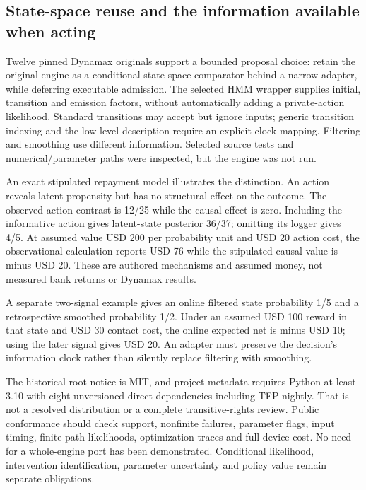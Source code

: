 \hypertarget{state-space-reuse-and-the-information-available-when-acting}{%
\subsection{State-space reuse and the information available when
acting}\label{state-space-reuse-and-the-information-available-when-acting}}

Twelve pinned Dynamax originals support a bounded proposal choice:
retain the original engine as a conditional-state-space comparator
behind a narrow adapter, while deferring executable admission. The
selected HMM wrapper supplies initial, transition and emission factors,
without automatically adding a private-action likelihood. Standard
transitions may accept but ignore inputs; generic transition indexing
and the low-level description require an explicit clock mapping.
Filtering and smoothing use different information. Selected source tests
and numerical/parameter paths were inspected, but the engine was not
run. \citep{exec19_dynamax_source}

An exact stipulated repayment model illustrates the distinction. An
action reveals latent propensity but has no structural effect on the
outcome. The observed action contrast is 12/25 while the causal effect
is zero. Including the informative action gives latent-state posterior
36/37; omitting its logger gives 4/5. At assumed value USD 200 per
probability unit and USD 20 action cost, the observational calculation
reports USD 76 while the stipulated causal value is minus USD 20. These
are authored mechanisms and assumed money, not measured bank returns or
Dynamax results.\citep{exec19_dynamax_reference}

A separate two-signal example gives an online filtered state probability
1/5 and a retrospective smoothed probability 1/2. Under an assumed USD
100 reward in that state and USD 30 contact cost, the online expected
net is minus USD 10; using the later signal gives USD 20. An adapter
must preserve the decision's information clock rather than silently
replace filtering with smoothing. \citep{exec19_dynamax_reference}

The historical root notice is MIT, and project metadata requires Python
at least 3.10 with eight unversioned direct dependencies including
TFP-nightly. That is not a resolved distribution or a complete
transitive-rights review. Public conformance should check support,
nonfinite failures, parameter flags, input timing, finite-path
likelihoods, optimization traces and full device cost. No need for a
whole-engine port has been demonstrated. Conditional likelihood,
intervention identification, parameter uncertainty and policy value
remain separate obligations.\citep{exec19_dynamax_source}

